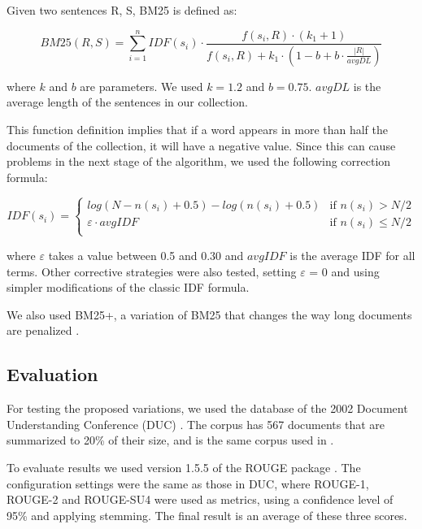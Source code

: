 \documentclass{llncs}
\begin{document}
\begin{definicion}
Given two sentences R, S, BM25 is defined as:

\begin{equation}
BM25(R,S) = \sum_{i=1}^{n} IDF(s_i) \cdot \frac{f(s_i, R) \cdot (k_1 + 1)}{f(s_i, R) + k_1 \cdot (1 - b + b \cdot \frac{|R|}{avgDL})}
\end{equation}

where $k$ and $b$ are parameters. We used $k = 1.2$ and $b = 0.75$. $avgDL$ is the average length of the sentences in our collection.
\end{definicion}

This function definition implies that if a word appears in more than half the documents of the collection, it will have a negative value. Since this can cause problems in the next stage of the algorithm, we used the following correction formula:
                
\begin{equation}
 IDF(s_i) =
  \begin{cases}
       log(N - n(s_i) + 0.5) - log(n(s_i) + 0.5)    & \text{if }  n(s_i) > N/2\\
       \varepsilon \cdot avgIDF                     & \text{if }  n(s_i) \leq N/2\\
  \end{cases}
\end{equation}                
                
where $\varepsilon$ takes a value between 0.5 and 0.30 and $avgIDF$ is the average IDF for all terms.
Other corrective strategies were also tested, setting $\varepsilon$ = 0 and using simpler modifications of the classic IDF formula.

We also used BM25+, a variation of BM25 that changes the way long documents are penalized \cite{lv}.


\subsection{Evaluation}
For testing the proposed variations, we used the database of the 2002 Document Understanding Conference (DUC) \cite{duc2002-guidelines}. The corpus has 567 documents that are summarized to 20\% of their size, and is the same corpus used in \cite{mihalcea-tarau}. 

To evaluate results we used version 1.5.5 of the ROUGE package \cite{Lin2004a}. The configuration settings were the same as those in DUC, where ROUGE-1, ROUGE-2 and ROUGE-SU4 were used as metrics, using a confidence level of 95\% and applying stemming. The final result is an average of these three scores.
\end{document}
